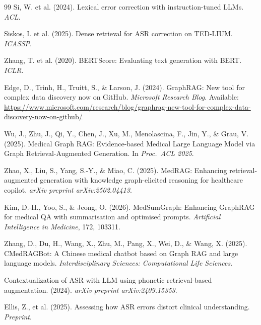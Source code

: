 \documentclass[11pt,a4paper,twocolumn]{article}
\begin{document}
\begin{thebibliography}{99}
Si, W. et al. (2024). Lexical error correction with instruction-tuned LLMs.
\textit{ACL}.

Siskos, I. et al. (2025). Dense retrieval for ASR correction on TED-LIUM.
\textit{ICASSP}.

Zhang, T. et al. (2020). BERTScore: Evaluating text generation with BERT.
\textit{ICLR}.

Edge, D., Trinh, H., Truitt, S., \& Larson, J. (2024). GraphRAG: New tool for
complex data discovery now on GitHub. \textit{Microsoft Research Blog}.
Available:
\url{https://www.microsoft.com/research/blog/graphrag-new-tool-for-complex-data-discovery-now-on-github/}

Wu, J., Zhu, J., Qi, Y., Chen, J., Xu, M., Menolascina, F., Jin, Y., \& Grau, V.
(2025). Medical Graph RAG: Evidence-based Medical Large Language Model via Graph
Retrieval-Augmented Generation. In \textit{Proc.\ ACL 2025}.

Zhao, X., Liu, S., Yang, S.-Y., \& Miao, C. (2025). MedRAG: Enhancing
retrieval-augmented generation with knowledge graph-elicited reasoning for
healthcare copilot. \textit{arXiv preprint arXiv:2502.04413}.

Kim, D.-H., Yoo, S., \& Jeong, O. (2026). MedSumGraph: Enhancing GraphRAG for
medical QA with summarisation and optimised prompts. \textit{Artificial
Intelligence in Medicine}, 172, 103311.

Zhang, D., Du, H., Wang, X., Zhu, M., Pang, X., Wei, D., \& Wang, X. (2025).
CMedRAGBot: A Chinese medical chatbot based on Graph RAG and large language
models. \textit{Interdisciplinary Sciences: Computational Life Sciences}.

Contextualization of ASR with LLM using phonetic retrieval-based augmentation.
(2024). \textit{arXiv preprint arXiv:2409.15353}.

Ellis, Z., et al. (2025). Assessing how ASR errors distort clinical
understanding. \textit{Preprint}.

\end{thebibliography}
\end{document}
